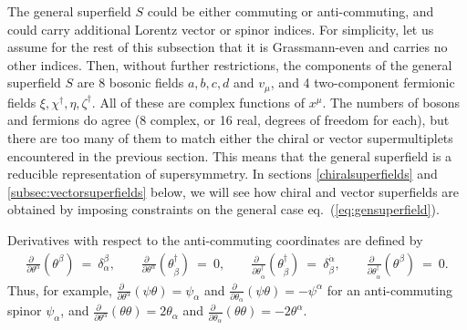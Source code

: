 \documentclass[11pt]{article}
\def\beq{\begin{eqnarray}}
\def\eeq{\end{eqnarray}}
\begin{document}
The general superfield $S$ could be either commuting or anti-commuting, and could carry 
additional Lorentz vector or spinor indices. For simplicity, let us 
assume for the rest of this subsection that it is Grassmann-even and 
carries no other indices. Then, without further restrictions, the 
components of the general superfield $S$ are 8 bosonic fields $a,b,c,d$ 
and $v_\mu$, and 4 two-component fermionic fields 
$\xi,\chi^\dagger,\eta,\zeta^\dagger$. All of these are complex functions 
of $x^\mu$. The numbers of bosons and fermions do agree (8 complex, or 16 
real, degrees of freedom for each), but there are too many of them to 
match either the chiral or vector supermultiplets encountered in the 
previous section. This means that the general superfield is a reducible
representation of supersymmetry.
In sections \ref{chiralsuperfields} and \ref{subsec:vectorsuperfields} 
below, we will see how chiral and vector superfields are 
obtained by imposing constraints on the general case 
eq.~(\ref{eq:gensuperfield}).

Derivatives with respect to the anti-commuting coordinates are defined by
\beq
\frac{\partial\phantom{x}}{\partial\theta^\alpha} (\theta^\beta) 
\>=\> \delta^\beta_\alpha ,
\qquad
\frac{\partial\phantom{x}}{\partial\theta^\alpha} 
(\theta^\dagger_{\dot\beta}) \>=\> 0 ,
\qquad
\frac{\partial\phantom{x}}{\partial\theta^\dagger_{\dot\alpha}} 
(\theta^\dagger_{\dot\beta}) \>=\> 
\delta^{\dot\alpha}_{\dot\beta} ,
\qquad
\frac{\partial\phantom{x}}{\partial\theta^\dagger_{\dot\alpha}} 
(\theta^{\beta}) \>=\> 0 .
\eeq
Thus, for example, 
$\frac{\partial\phantom{x}}{\partial\theta^\alpha}(\psi\theta) = \psi_\alpha$
and
$\frac{\partial\phantom{x}}{\partial\theta_\alpha}(\psi\theta) = -\psi^\alpha$ 
for an anti-commuting spinor $\psi_\alpha$, and
$\frac{\partial\phantom{x}}{\partial\theta^\alpha}(\theta\theta) = 2 
\theta_\alpha$ and 
$\frac{\partial\phantom{x}}{\partial\theta_\alpha}(\theta\theta) = -2 
\theta^\alpha$.
\end{document}
